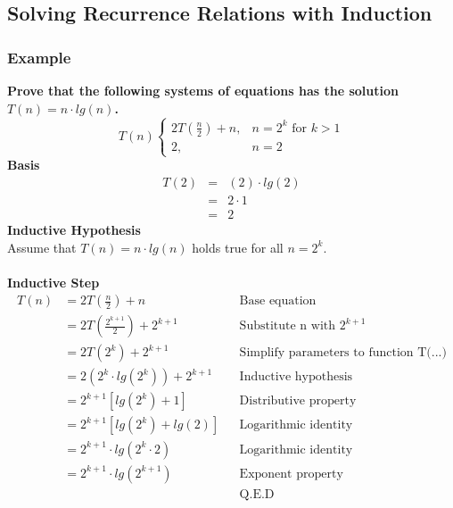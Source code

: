 \subsection{Solving Recurrence Relations with Induction}

\subsubsection{Example}
\textbf{Prove that the following systems of equations has the solution $T(n) = n \cdot lg(n)$.}
$$
T(n) \begin{cases}
	2T(\frac{n}{2}) + n, & n = 2^k \mbox{ for } k > 1\\
	2, & n = 2
\end{cases}
$$
\textbf{Basis}
\begin{eqnarray*}
T(2) &=& (2) \cdot lg(2)\\
	&=& 2 \cdot 1\\
	&=& 2
\end{eqnarray*}
\textbf{Inductive Hypothesis}\\
Assume that $T(n) = n \cdot lg(n)$ holds true for all $n = 2^k$.\\\\
\textbf{Inductive Step}
\begin{align*}
T(n)	&=	2T(\frac{n}{2}) + n						&& \text{Base equation}\\
		&= 	2T(\frac{2^{k+1}}{2}) + 2^{k+1}			&& \text{Substitute n with } 2^{k+1}\\
		&= 	2T(2^{k}) + 2^{k+1}						&& \text{Simplify parameters to function T(...)}\\
		&=	2(2^k \cdot lg(2^k)) + 2^{k+1}			&& \text{Inductive hypothesis}\\
		&=	2^{k+1} \left[ lg(2^k) + 1 \right]		&& \text{Distributive property}\\
		&=  2^{k+1} \left[ lg(2^k) + lg(2) \right]  && \text{Logarithmic identity}\\
		&= 	2^{k+1} \cdot lg(2^k \cdot 2)			&& \text{Logarithmic identity}\\
		&=  2^{k+1} \cdot lg(2^{k+1})				&& \text{Exponent property}\\
		&											&& \text{Q.E.D}
\end{align*}

